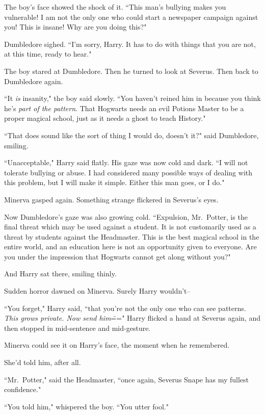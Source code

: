 The boy's face showed the shock of it. ``This man's bullying makes you vulnerable! I am not the only one who could start a newspaper campaign against you! This is insane! Why are you doing this?"

Dumbledore sighed. ``I'm sorry, Harry. It has to do with things that you are not, at this time, ready to hear."

The boy stared at Dumbledore. Then he turned to look at Severus. Then back to Dumbledore again.

``It \emph{is} insanity," the boy said slowly. ``You haven't reined him in because you think he's \emph{part of the pattern}. That Hogwarts needs an evil Potions Master to be a proper magical school, just as it needs a ghost to teach History."

``That does sound like the sort of thing I would do, doesn't it?" said Dumbledore, smiling.

``Unacceptable," Harry said flatly. His gaze was now cold and dark. ``I will not tolerate bullying or abuse. I had considered many possible ways of dealing with this problem, but I will make it simple. Either this man goes, or I do."

Minerva gasped again. Something strange flickered in Severus's eyes.

Now Dumbledore's gaze was also growing cold. ``Expulsion, Mr.~Potter, is the final threat which may be used against a student. It is not customarily used as a threat by students against the Headmaster. This is the best magical school in the entire world, and an education here is not an opportunity given to everyone. Are you under the impression that Hogwarts cannot get along without you?"

And Harry sat there, smiling thinly.

Sudden horror dawned on Minerva. Surely Harry wouldn't\---

``You forget," Harry said, ``that you're not the only one who can see patterns. \emph{This grows private. Now send him}\===" Harry flicked a hand at Severus again, and then stopped in mid-sentence and mid-gesture.

Minerva could see it on Harry's face, the moment when he remembered.

She'd told him, after all.

``Mr.~Potter," said the Headmaster, ``once again, Severus Snape has my fullest confidence."

``You told him," whispered the boy. ``You utter fool."

